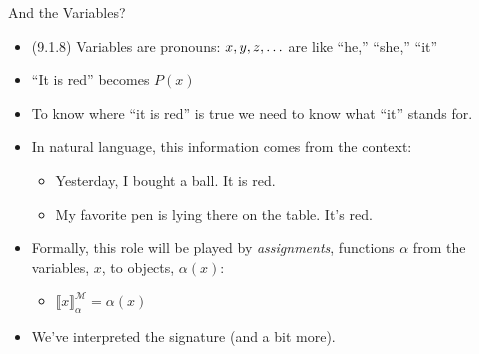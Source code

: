 \begin{frame}{And the Variables?}

	\begin{itemize}
	
		\item (9.1.8) Variables are pronouns: $x,y,z,\mathellipsis$ are like ``he,'' ``she,'' ``it''
		
		\item ``It is red'' becomes $P(x)$
		
		\item To know where ``it is red'' is true we need to know what ``it'' stands for.
		
		\item In natural language, this information comes from the context:
		
		\begin{itemize}
		
			\item Yesterday, I bought a ball. It is red.
			
			\item My favorite pen is lying there on the table. It's red.
		
		\end{itemize}
		
		\item Formally, this role will be played by \emph{assignments}, functions $\alpha$ from the variables, $x$, to objects, $\alpha(x)$:
		
		\begin{itemize}
		
			\item $\llbracket x\rrbracket^\mathcal{M}_\alpha=\alpha(x)$
		
		\end{itemize}
	
	\item We've interpreted the signature (and a bit more).
	
	\end{itemize}


\end{frame}

